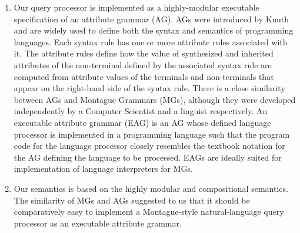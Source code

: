 \documentclass[../main.tex]{subfiles}
\begin{document}
\begin{refsection}
\begin{enumerate}
	\item Our query processor is implemented as a highly-modular executable specification of an attribute grammar (AG). AGs were introduced by Knuth \cite{knuth1968semantics} and are
	widely used to define both the syntax and semantics of programming languages. Each syntax
	rule has one or more attribute rules associated with it. The attribute rules define how the value
	of synthesized and inherited attributes of the non-terminal defined by the
	associated syntax rule are computed from attribute values of the terminals and non-terminals
	that appear on the right-hand side of the syntax rule. There is a close similarity between AGs
	and Montague Grammars (MGs), although they were developed independently by a Computer
	Scientist and a linguist respectively. An executable attribute grammar (EAG) is an AG whose
	defined language processor is implemented in a programming language such that the program
	code for the language processor closely resembles the textbook notation for the AG defining
	the language to be processed. EAGs are ideally suited for
	implementation of language interpreters for MGs.
	
	\item Our semantics is based on the highly modular and compositional semantics. The similarity of MGs and AGs suggested to us that it should
	be comparatively easy to implement a Montague-style natural-language query processor as an
	executable attribute grammar.
	

\end{enumerate}
\end{refsection}
\end{document}
